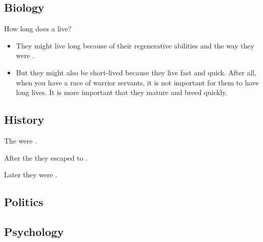 \subsection{Biology}
How long does a \cregorr{} live? 

\begin{itemize}
  \item 
    They might live long because of their regenerative abilities and the way they were . 
  
  \item 
    But they might also be short-lived because they live fast and  quick. 
    After all, when you have a race of warrior servants, it is not important for them to have long lives. 
    It is more important that they mature and breed quickly. 
\end{itemize}









\subsection{History}
The \cregorrs{} were . 

After the \firstbanewar{} they escaped to . 

Later they were . 









\subsection{Politics}










\subsection{Psychology}





